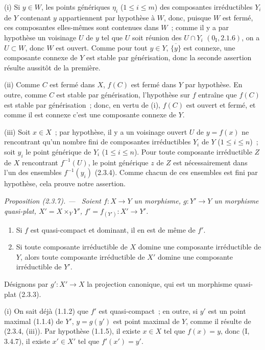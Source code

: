 \documentclass[10pt,oneside]{book}
\newcommand{\oldpage}[2][]{%
  \setcounter{footnote}{0}%
  \marginpar{\scriptsize\textbf{#1}~|~#2}\ignorespaces}
\newenvironment{proposition}[1][]{%
  \par\medskip\noindent\itshape Proposition (#1). ---\ }{\par}
\begin{document}
\oldpage[IV-2]{16}
(i) Si $y\in W$, les points génériques $\eta_i$ ($1\leq i\leq m$) des
composantes irréductibles $Y_i$ de $Y$ contenant $y$ appartiennent par
hypothèse à $W$, donc, puisque $W$ est fermé, ces composantes elles-mêmes sont
contenues dans $W$~; comme il y a par hypothèse un voisinage $U$ de $y$ tel que
$U$ soit réunion des $U\cap Y_i$ $(0_{\mathrm I},2.1.6)$, on a
$U\subset W$, donc $W$ est ouvert. Comme pour tout $y\in Y$,
$\overline{\{y\}}$ est connexe, une composante connexe de $Y$ est stable par
générisation, donc la seconde assertion résulte aussitôt de la première.

(ii) Comme $C$ est fermé dans $X$, $f(C)$ est fermé dans $Y$ par hypothèse. En
outre, comme $C$ est stable par générisation, l'hypothèse sur $f$ entraîne que
$f(C)$ est stable par générisation~; donc, en vertu de (i), $f(C)$ est ouvert
et fermé, et comme il est connexe c'est une composante connexe de $Y$.

(iii) Soit $x\in X$~; par hypothèse, il y a un voisinage ouvert $U$ de
$y=f(x)$ ne rencontrant qu'un nombre fini de composantes irréductibles $Y_i$
de $Y$ ($1\leq i\leq n$)~; soit $y_i$ le point générique de $Y_i$
($1\leq i\leq n$). Pour toute composante irréductible $Z$ de $X$ rencontrant
$f^{-1}(U)$, le point générique $z$ de $Z$ est nécessairement dans l'un des
ensembles $f^{-1}(y_i)$ (2.3.4). Comme chacun de ces ensembles est fini par
hypothèse, cela prouve notre assertion.

\begin{proposition}[2.3.7]
\label{IV.2.3.7-fr}
Soient $f:X\to Y$ un morphisme, $g:Y'\to Y$ un morphisme quasi-plat,
$X'=X\times_Y Y'$, $f'=f_{(Y')}:X'\to Y'$.
\begin{enumerate}
  \item[(i)] Si $f$ est quasi-compact et dominant, il en est de même de $f'$.
  \item[(ii)] Si toute composante irréductible de $X$ domine une composante
  irréductible de $Y$, alors toute composante irréductible de $X'$ domine une
  composante irréductible de $Y'$.
\end{enumerate}
\end{proposition}

Désignons par $g':X'\to X$ la projection canonique, qui est un morphisme
quasi-plat (2.3.3).

(i) On sait déjà (1.1.2) que $f'$ est quasi-compact~; en outre, si $y'$ est un
point maximal (1.1.4) de $Y'$, $y=g(y')$ est point maximal de $Y$, comme il
résulte de (2.3.4, (iii)). Par hypothèse (1.1.5), il existe $x\in X$ tel que
$f(x)=y$, donc (I, 3.4.7), il existe $x'\in X'$ tel que $f'(x')=y'$.
\end{document}
